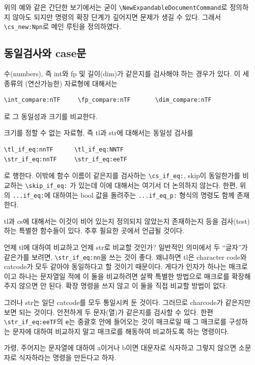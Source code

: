 \documentclass[a4paper,amsmath]{oblivoir}
\newcounter{sub}
\newcommand\bangotsuite{\stepcounter{sub}\thesub}
\begin{document}
위의 예와 같은 간단한 보기에서는 굳이 \verb|\NewExpandableDocumentCommand|로 정의하지 않아도 되지만 명령의 확장 단계가 깊어지면 문제가 생길 수 있다. 그래서 \verb|\cs_new:Npn|로 메인 루틴을 정의하였다.

\subsection{동일검사와 case문}

수(numbers), 즉 \textsf{int}와 \textsf{fp} 및 길이(\textsf{dim})가 같은지를 검사해야 하는 경우가 있다. 이 세 종류의 (연산가능한) 자료형에 대해서는
\begin{verbatim}
\int_compare:nTF     \fp_compare:nTF       \dim_compare:nTF
\end{verbatim}
로 그 동일성과 크기를 비교한다.

크기를 정할 수 없는 자료형, 즉 \textsf{tl}과 \textsf{str}에 대해서는 동일성 검사를
\begin{verbatim}
\tl_if_eq:nnTF      \tl_if_eq:NNTF
\str_if_eq:nnTF     \str_if_eq:eeTF
\end{verbatim}
로 행한다. 이밖에 함수 이름이 같은지를 검사하는 \verb|\cs_if_eq:|, skip이 동일한가를 비교하는 \verb|\skip_if_eq:| 가 있는데 이에 대해서는 여기서 더 논의하지 않는다.
한편, 위의 \verb|...if_eq:|에 대하여는 bool 값을 돌려주는 \verb|...if_eq_p:| 형식의 명령도 함께 존재한다.

\medskip

\hangfrom{붙임 \bangotsuite: }tl과 cs에 대해서는 이것이 비어 있는지 정의되지 않았는지 존재하는지 등을 검사(test)하는 특별한 함수들이 있다. 추후 필요한 곳에서 언급될 것이다.

\medskip

언제 tl에 대하여 비교하고 언제 str로 비교할 것인가? 일반적인 의미에서 두 ``글자''가 같은가를 보려면, \verb|\str_if_eq:nn|을 쓰는 것이 좋다. 왜냐하면 tl은 character code와 catcode가 모두 같아야 동일하다고 할 것이기 때문이다. 게다가 인자가 하나는 매크로이고 하나는 문자열일 적에 이 둘을 비교하려면 살짝 특별한 방법으로 매크로를 확장해주지 않으면 안 된다. 확장 명령을 쓰지 않고 이 둘을 직접 비교할 방법이 없다.

그러나 str는 일단 catcode를 모두 통일시켜 둔 것이다. 그러므로 charcode가 같은지만 보면 되는 것이다. 안전하게 두 문자(열)가 같은지를 검사할 수 있다. 한편 \verb|\str_if_eq:eeTF|의 \verb|e|는 중괄호 안에 들어오는 것이 매크로일 때 그 매크로를 구성하는 문자에 대하여 비교하지 말고 매크로를 해동하여 비교하도록 하는 명령이다. 

\bigskip
가령, 주어지는 문자열에 대하여 a이거나 b이면 대문자로 식자하고 그렇지 않으면 소문자로 식자하라는 명령을 만든다고 하자.
\end{document}
